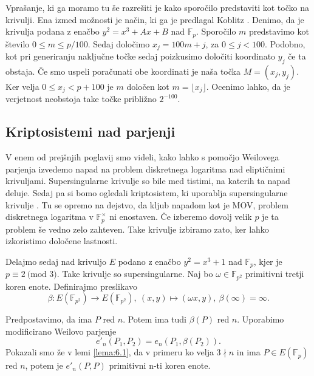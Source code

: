 \documentclass[12pt,a4paper,twoside]{article}
\theoremstyle{definition} %
\theoremstyle{plain} %
\numberwithin{equation}{section}  %
\newcommand{\F}{\mathbb F}
\newcommand{\E}[1]{E({#1})}
\newcommand{\MOD}[1]{\ \text{(mod }{#1}\text{)}}
\begin{document}
Vprašanje, ki ga moramo tu še razrešiti je kako sporočilo predstaviti kot točko na krivulji. Ena izmed možnosti je način, ki ga je predlagal Koblitz \cite{Koblitz1987}. Denimo, da je krivulja podana z enačbo
$y^2 = x^3+Ax+B$ nad $\F_p$. Sporočilo $m$ predstavimo kot število $0 \leq m \leq p/100$. Sedaj določimo $x_j = 100m+j$, za $0\leq j < 100$. Podobno, kot pri generiranju naključne točke sedaj poizkusimo določiti koordinato $y_j$ če ta obstaja. Če smo uspeli poračunati obe koordinati je naša točka $M=(x_j,y_j)$. Ker velja $0\leq x_j < p+100$ je $m$ določen kot
$m = \lfloor x_j \rfloor$.
Ocenimo lahko, da je verjetnost neobstoja take točke približno $2^{-100}$.

\subsection{Kriptosistemi nad parjenji}

V enem od prejšnjih poglavij smo videli, kako lahko s pomočjo Weilovega parjenja izvedemo napad na problem diskretnega logaritma nad eliptičnimi krivuljami. Supersingularne krivulje so bile med tistimi, na katerih ta napad deluje. Sedaj pa si bomo ogledali kriptosistem, ki uporablja supersingularne krivulje \cite{Boneh2003}. Tu se opremo na dejstvo, da kljub napadom kot je MOV, problem diskretnega logaritma v $\F^{\times}_p$ ni enostaven. Če izberemo dovolj velik $p$ je ta problem še vedno zelo zahteven. Take krivulje izbiramo zato, ker lahko izkoristimo določene lastnosti.

Delajmo sedaj nad krivuljo $E$ podano z enačbo $y^2=x^3+1$ nad $\F_p$, kjer je $p \equiv 2 \MOD{3}$. Take krivulje so supersingularne. Naj bo $\omega \in \F_{p^2}$ primitivni tretji koren enote. Definirajmo preslikavo
$$\beta:\E{\F_{p^2}} \rightarrow \E{\F_{p^2}}, \ (x,y) \mapsto (\omega x,y), \ \beta(\infty) = \infty.$$

Predpostavimo, da ima $P$ red $n$. Potem ima tudi $\beta(P)$ red $n$. Uporabimo modificirano Weilovo parjenje
$$e'_n(P_1,P_2)  =e_n(P_1,\beta(P_2)).$$
Pokazali smo že v lemi \ref{lema:6.1}, da v primeru ko velja $3 \nmid n$ in ima $P \in \E{\F_p}$ red $n$, potem je $e'_n(P,P)$ primitivni n-ti koren enote.
\end{document}
